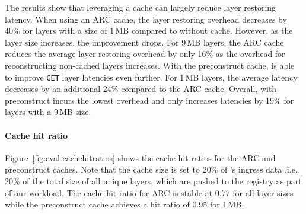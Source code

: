 %
The results show that
leveraging a cache can largely reduce layer restoring latency.
%
When using an ARC cache, the layer restoring overhead decreases by 40\% for layers with
a size of 1\,MB compared to \sysname without cache.
%
However, as the layer size increases,  the improvement drops.
%
For 9\,MB layers, the ARC cache reduces the average layer restoring overhead by only 16\%
as the overhead for reconstructing non-cached layers increases.
%
%
With the preconstruct cache, \sysname is able to improve \texttt{GET} layer latencies even further.
%
For 1\,MB layers, the average latency decreases by an additional 24\% compared to the ARC cache.
%
Overall, \sysname with preconstruct incurs the lowest overhead and only increases latencies by
19\% for layers with a 9\,MB size. 

\paragraph{Cache hit ratio}
%
Figure~\ref{fig:eval-cachehitratios} shows the cache hit ratios for the ARC and
preconstruct caches.
%
Note that the cache size is set to 20\% of \dal{}'s ingress data ,i.e. 20\% of the total size of
all unique layers, which are pushed to the registry as part of our workload.
%
%
%
The cache hit ratio for ARC is stable at 0.77 for all layer sizes while
the preconstruct cache achieves a hit ratio of 0.95 for 1\,MB.

